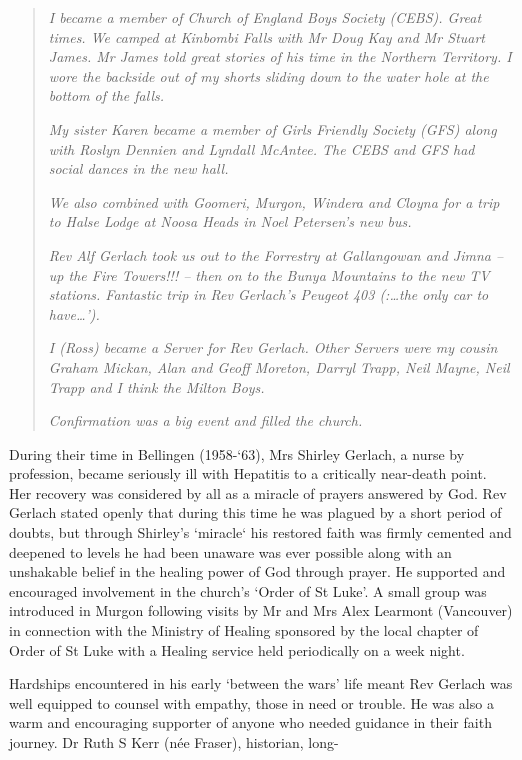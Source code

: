 \begin{quote}
\emph{I became a member of Church of England Boys Society (CEBS). Great
times. We camped at Kinbombi Falls with Mr Doug Kay and Mr Stuart James.
Mr James told great stories of his time in the Northern Territory. I
wore the backside out of my shorts sliding down to the water hole at the
bottom of the falls.}

\emph{My sister Karen became a member of Girls Friendly Society (GFS)
along with Roslyn Dennien and Lyndall McAntee. The CEBS and GFS had
social dances in the new hall.}

\emph{We also combined with Goomeri, Murgon, Windera and Cloyna for a
trip to Halse Lodge at Noosa Heads in Noel Petersen's new bus.}

\emph{Rev Alf Gerlach took us out to the Forrestry at Gallangowan and
Jimna -- up the Fire Towers!!! -- then on to the Bunya Mountains to the
new TV stations. Fantastic trip in Rev Gerlach's Peugeot 403
(:\ldots the only car to have\ldots').}

\emph{I (Ross) became a Server for Rev Gerlach. Other Servers were my
cousin Graham Mickan, Alan and Geoff Moreton, Darryl Trapp, Neil Mayne,
Neil Trapp and I think the Milton Boys.}

\emph{Confirmation was a big event and filled the church.}
\end{quote}

During their time in Bellingen (1958-`63), Mrs Shirley Gerlach, a nurse
by profession, became seriously ill with Hepatitis to a critically
near-death point. Her recovery was considered by all as a miracle of
prayers answered by God. Rev Gerlach stated openly that during this time
he was plagued by a short period of doubts, but through Shirley's
`miracle` his restored faith was firmly cemented and deepened to levels
he had been unaware was ever possible along with an unshakable belief in
the healing power of God through prayer. He supported and encouraged
involvement in the church's `Order of St Luke'. A small group was
introduced in Murgon following visits by Mr and Mrs Alex Learmont
(Vancouver) in connection with the Ministry of Healing sponsored by the
local chapter of Order of St Luke with a Healing service held
periodically on a week night.

Hardships encountered in his early `between the wars' life meant Rev
Gerlach was well equipped to counsel with empathy, those in need or
trouble. He was also a warm and encouraging supporter of anyone who
needed guidance in their faith journey. Dr Ruth S Kerr (née Fraser),
historian, long-

